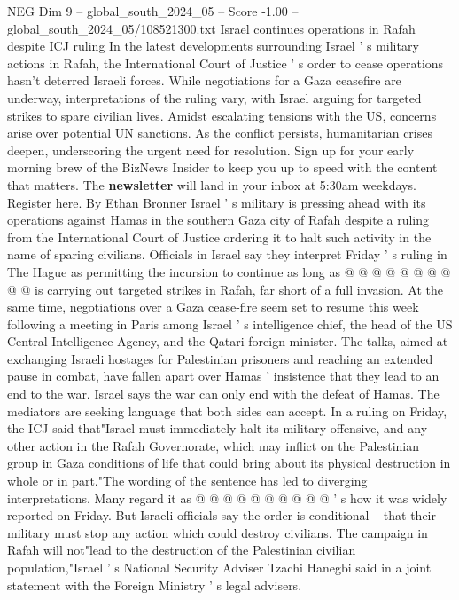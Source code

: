 \begin{textsample}{NEG Dim 9 – global\_south\_2024\_05 – Score -1.00 – global\_south\_2024\_05/108521300.txt}  \label{ex:f9_neg_331}
Israel continues operations in Rafah despite ICJ ruling In the latest developments surrounding Israel ' s military actions in Rafah, the International Court of Justice ' s order to cease operations hasn't deterred Israeli forces.
While negotiations for a Gaza ceasefire are underway, interpretations of the ruling vary, with Israel arguing for targeted strikes to spare civilian lives.
Amidst escalating tensions with the US, concerns arise over potential UN sanctions.
As the conflict persists, humanitarian crises deepen, underscoring the urgent need for resolution.
Sign up for your early morning brew of the BizNews Insider to keep you up to speed with the content that matters.
The \textbf{newsletter} will land in your inbox at 5:30am weekdays.
Register here.
By Ethan Bronner Israel ' s military is pressing ahead with its operations against Hamas in the southern Gaza city of Rafah despite a ruling from the International Court of Justice ordering it to halt such activity in the name of sparing civilians.
Officials in Israel say they interpret Friday ' s ruling in The Hague as permitting the incursion to continue as long as @ @ @ @ @ @ @ @ @ @ is carrying out targeted strikes in Rafah, far short of a full invasion.
At the same time, negotiations over a Gaza cease-fire seem set to resume this week following a meeting in Paris among Israel ' s intelligence chief, the head of the US Central Intelligence Agency, and the Qatari foreign minister.
The talks, aimed at exchanging Israeli hostages for Palestinian prisoners and reaching an extended pause in combat, have fallen apart over Hamas ' insistence that they lead to an end to the war.
Israel says the war can only end with the defeat of Hamas.
The mediators are seeking language that both sides can accept.
In a ruling on Friday, the ICJ said that"Israel must immediately halt its military offensive, and any other action in the Rafah Governorate, which may inflict on the Palestinian group in Gaza conditions of life that could bring about its physical destruction in whole or in part."The wording of the sentence has led to diverging interpretations.
Many regard it as @ @ @ @ @ @ @ @ @ @ ' s how it was widely reported on Friday.
But Israeli officials say the order is conditional -- that their military must stop any action which could destroy civilians.
The campaign in Rafah will not"lead to the destruction of the Palestinian civilian population,"Israel ' s National Security Adviser Tzachi Hanegbi said in a joint statement with the Foreign Ministry ' s legal advisers.

\end{textsample}
